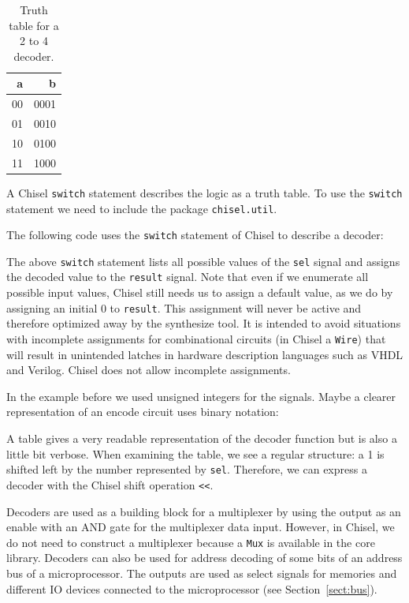 \documentclass[%
    10pt,
    headinclude, footexclude,
    openright, %
    notitlepage,
    cleardoubleempty,
    headsepline,
    pointlessnumbers,
    bibtotoc, idxtotoc,
    ]{scrbook}
\newcommand{\code}[1]{{\small{\texttt{#1}}}}
\begin{document}
\begin{table}
 \centering
  \begin{tabular}{rr}
    \toprule
    a & b \\
    \midrule
    00 & 0001 \\
    01 & 0010 \\
    10 & 0100 \\
    11 & 1000 \\
    \bottomrule
  \end{tabular}
  \caption{Truth table for a 2 to 4 decoder.}
 \label{tab:decoder}
\end{table}

A Chisel \code{switch} statement describes the logic as a truth table.
To use the \code{switch} statement we need to include the package \code{chisel.util}.


\noindent The following code uses the \code{switch} statement of Chisel to describe a decoder:



\noindent The above \code{switch} statement lists all possible values of the \code{sel} signal
and assigns the decoded value to the \code{result} signal.
Note that even if we enumerate all possible input values, Chisel still needs us to assign a
default value, as we do by assigning an initial 0 to \code{result}.
This assignment will never be active and therefore optimized away by the synthesize tool.
It is intended to avoid situations with incomplete assignments for combinational circuits
(in Chisel a \code{Wire}) that will result in unintended latches in hardware description
languages such as VHDL and Verilog. Chisel does not allow incomplete assignments.

In the example before we used unsigned integers for the signals. Maybe a clearer representation
of an encode circuit uses binary notation:



A table gives a very readable representation of the decoder function but is also
a little bit verbose.
When examining the table, we see a regular structure: a 1 is shifted left by the number
represented by \code{sel}. Therefore, we can express a decoder with the Chisel shift
operation \code{<<}.


Decoders are used as a building block for a multiplexer by using the output as an enable
with an AND gate for the multiplexer data input. However, in Chisel, we do not need to construct
a multiplexer because a \code{Mux} is available in the core library.
Decoders can also be used for address decoding of some bits of an address bus of
a microprocessor. The outputs are used as
select signals for memories and different IO devices connected to the microprocessor
(see Section~\ref{sect:bus}).
\end{document}
